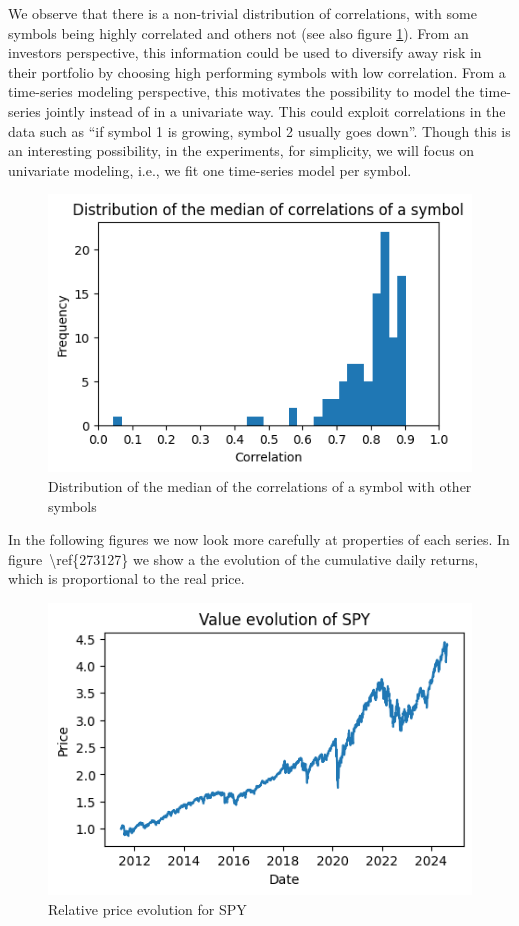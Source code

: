 \documentclass[10pt]{article}
\begin{document}
We observe that there is a non-trivial distribution of correlations,
with some symbols being highly correlated and others not (see also
figure {\ref{548098}}). From an investors perspective,
this information could be used to diversify away risk in their portfolio
by choosing high performing symbols with low correlation. From a
time-series modeling perspective, this motivates the possibility to
model the time-series jointly instead of in a univariate way. This could
exploit correlations in the data such as ``if symbol 1 is growing,
symbol 2 usually goes down''. Though this is an interesting possibility,
in the experiments, for simplicity, we will focus on univariate
modeling, i.e., we fit one time-series model per symbol.
\begin{figure}[H]
\begin{center}
\includegraphics[width=0.70\columnwidth]{figures/output4/output4}
\caption{{Distribution of the median of the correlations of a symbol with other
symbols
{\label{548098}}%
}}
\end{center}
\end{figure}

In the following figures we now look more carefully at properties of
each series. In figure~{\textbackslash ref\{273127\}} we show a the
evolution of the cumulative daily returns, which is proportional to the
real price.
\begin{figure}[H]
\begin{center}
\includegraphics[width=0.70\columnwidth]{figures/output3/output3}
\caption{{Relative price evolution for SPY
{\label{273127}}%
}}
\end{center}
\end{figure}
\end{document}
